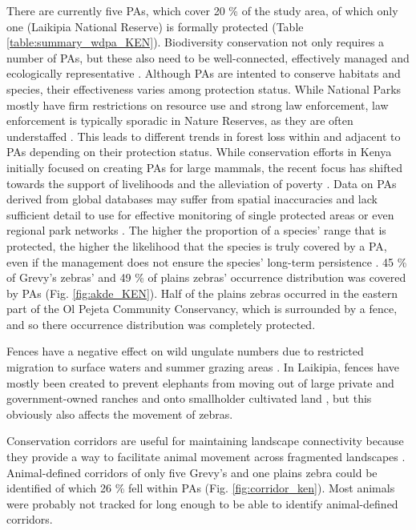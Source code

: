 \documentclass[12pt,a4paper, twoside, english]{article}
\begin{document}

There are currently five PAs, which cover 20 \% of the study area, of which only one (Laikipia National Reserve) is formally protected (Table \ref{table:summary_wdpa_KEN}). Biodiversity conservation not only requires a number of PAs, but these also need to be well-connected, effectively managed and ecologically representative \citep{Dewi2013}. Although PAs are intented to conserve habitats and species, their effectiveness varies among protection status. While National Parks mostly have firm restrictions on resource use and strong law enforcement, law enforcement is typically sporadic in Nature Reserves, as they are often understaffed \citep{Caro2009}. This leads to different trends in forest loss within and adjacent to PAs depending on their protection status. While conservation efforts in Kenya initially focused on creating PAs for large mammals, the recent focus has shifted towards the support of livelihoods and the alleviation of poverty \citep{Pfeifer2012}. Data on PAs derived from global databases may suffer from spatial inaccuracies and lack sufficient detail to use for effective monitoring of single protected areas or even regional park networks \citep{Chape2005, Nagendra2013}. The higher the proportion of a species' range that is protected, the higher the likelihood that the species is truly covered by a PA, even if the management does not ensure the species' long-term persistence \citep{Rodrigues2004}. 45 \% of Grevy's zebras' and 49 \% of plains zebras' occurrence distribution was covered by PAs (Fig. \ref{fig:akde_KEN}). Half of the plains zebras occurred in the eastern part of the Ol Pejeta Community Conservancy, which is surrounded by a fence, and so there occurrence distribution was completely protected.


Fences have a negative effect on wild ungulate numbers due to restricted migration to surface waters and summer grazing areas \citep{Coughenour1991}. In Laikipia, fences have mostly been created to prevent elephants from moving out of large private and government-owned ranches and onto smallholder cultivated land \citep{Evans2016a}, but this obviously also affects the movement of zebras.


Conservation corridors are useful for maintaining landscape connectivity because they provide a way to facilitate animal movement across fragmented landscapes \citep{Gilbert-Norton2010}. Animal-defined corridors of only five Grevy's and one plains zebra could be identified of which 26 \% fell within PAs (Fig. \ref{fig:corridor_ken}). Most animals were probably not tracked for long enough to be able to identify animal-defined corridors.
\end{document}
